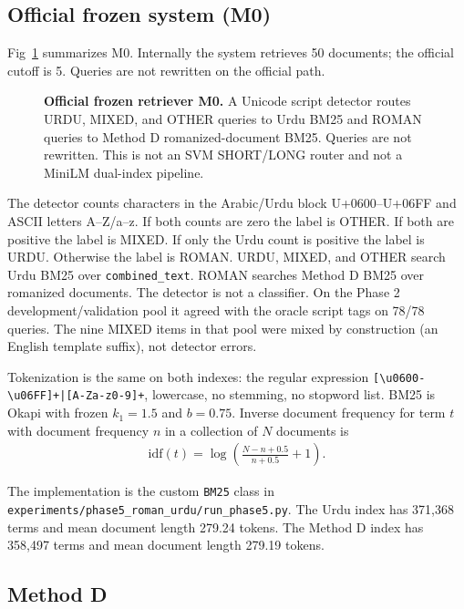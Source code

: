 \documentclass[10pt,letterpaper]{article}
\begin{document}
\subsection*{Official frozen system (M0)}

Fig~\ref{fig1} summarizes M0. Internally the system retrieves 50 documents; the official cutoff is 5. Queries are not rewritten on the official path.

\begin{figure}[!h]
\caption{\textbf{Official frozen retriever M0.} A Unicode script detector routes URDU, MIXED, and OTHER queries to Urdu BM25 and ROMAN queries to Method D romanized-document BM25. Queries are not rewritten. This is not an SVM SHORT/LONG router and not a MiniLM dual-index pipeline.}
\label{fig1}
\end{figure}

The detector counts characters in the Arabic/Urdu block U+0600--U+06FF and ASCII letters A--Z/a--z. If both counts are zero the label is OTHER. If both are positive the label is MIXED. If only the Urdu count is positive the label is URDU. Otherwise the label is ROMAN. URDU, MIXED, and OTHER search Urdu BM25 over \texttt{combined\_text}. ROMAN searches Method D BM25 over romanized documents. The detector is not a classifier. On the Phase 2 development/validation pool it agreed with the oracle script tags on 78/78 queries. The nine MIXED items in that pool were mixed by construction (an English template suffix), not detector errors.

Tokenization is the same on both indexes: the regular expression \texttt{[\textbackslash u0600-\textbackslash u06FF]+|[A-Za-z0-9]+}, lowercase, no stemming, no stopword list. BM25 is Okapi with frozen $k_1 = 1.5$ and $b = 0.75$. Inverse document frequency for term $t$ with document frequency $n$ in a collection of $N$ documents is
\begin{eqnarray}
\label{eq:idf}
\mathrm{idf}(t) = \log\left(\frac{N - n + 0.5}{n + 0.5} + 1\right).
\end{eqnarray}

The implementation is the custom \texttt{BM25} class in \texttt{experiments/phase5\_roman\_urdu/run\_phase5.py}. The Urdu index has 371,368 terms and mean document length 279.24 tokens. The Method D index has 358,497 terms and mean document length 279.19 tokens.

\subsection*{Method D}
\end{document}
